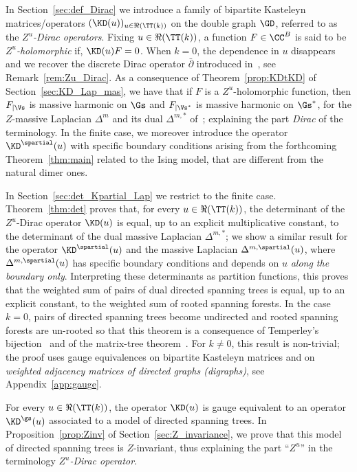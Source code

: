 \documentclass[a4paper,twoside,11pt]{article}
\begin{document}
In Section~\ref{sec:def_Dirac} we introduce a 
family of bipartite Kasteleyn matrices/operators $(\KD(u))_{u\in\Re(\TT(k))}$ on the double graph $\GD$, referred to as the 
\emph{$Z^u$-Dirac operators}. Fixing $u\in\Re(\TT(k))$, a function 
$F\in\CC^{B}$ is said to be \emph{$Z^u$-holomorphic} if, $\KD(u)F=0$. When $k=0$, the dependence in $u$ disappears and we recover the 
discrete Dirac operator $\bar{\partial}$ introduced in~\cite{Kenyon3}, see Remark~\ref{rem:Zu_Dirac}. As a consequence of Theorem~\ref{prop:KDtKD} of Section~\ref{sec:KD_Lap_mas}, we have that if
$F$ is a $Z^u$-holomorphic function, then $F_{|\Vs}$ is massive harmonic on $\Gs$
and $F_{|\Vs^*}$ is massive harmonic on $\Gs^*$,
for the $Z$-massive Laplacian $\Delta^m$ and its dual $\Delta^{m,*}$ of~\cite{BdTR1}; explaining the part \emph{Dirac} of the terminology. 
In the finite case, we moreover introduce the operator $\KD^\spartial(u)$ with  
specific boundary conditions arising from the forthcoming Theorem~\ref{thm:main} related to the Ising model,
that are different from the natural dimer ones.

In Section~\ref{sec:det_Kpartial_Lap} we restrict to the finite case. Theorem~\ref{thm:det} proves that, for every $u\in\Re(\TT(k))$,
the determinant of the $Z^u$-Dirac operator $\KD(u)$ is equal, up to an explicit multiplicative constant, to the determinant of the dual massive Laplacian $\Delta^{m,*}$; we show a similar result
for the operator $\KD^\spartial(u)$ and the massive Laplacian $\Delta^{m,\spartial}(u)$, where $\Delta^{m,\spartial}(u)$ has
specific boundary conditions and depends on $u$ \emph{along the boundary only}. 
Interpreting these determinants as partition functions, this proves that the weighted sum of pairs of dual directed spanning 
trees is equal, up to an explicit constant, to the weighted sum of rooted spanning forests. In the case $k=0$, pairs of directed spanning trees
become undirected and rooted spanning forests are un-rooted so that this theorem is a consequence of Temperley's bijection~\cite{Temperley} and 
of the matrix-tree theorem~\cite{Kirchhoff}. For $k\neq 0$, this result is non-trivial; the proof uses gauge equivalences on bipartite Kasteleyn matrices and on
\emph{weighted adjacency matrices of directed graphs (digraphs)}, see Appendix~\ref{app:gauge}.

For every $u\in\Re(\TT(k))$, the operator $\KD(u)$ is gauge equivalent to an operator $\KD^\gs(u)$ associated to a model of directed spanning trees. 
In Proposition~\ref{prop:Zinv} of
Section~\ref{sec:Z_invariance}, we prove that this model of directed spanning trees is $Z$-invariant, thus explaining the part ``$Z^u$'' 
in the terminology \emph{$Z^u$-Dirac operator}. 
\end{document}
